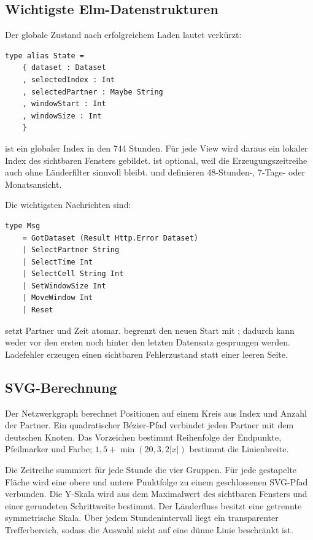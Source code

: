 \subsection*{Wichtigste Elm-Datenstrukturen}

Der globale Zustand nach erfolgreichem Laden lautet verkürzt:

\begin{lstlisting}[language={}]
type alias State =
    { dataset : Dataset
    , selectedIndex : Int
    , selectedPartner : Maybe String
    , windowStart : Int
    , windowSize : Int
    }
\end{lstlisting}

 ist ein globaler Index in den 744 Stunden. Für jede View
wird daraus ein lokaler Index des sichtbaren Fensters gebildet.
 ist optional, weil die Erzeugungszeitreihe auch ohne
Länderfilter sinnvoll bleibt.  und 
definieren 48-Stunden-, 7-Tage- oder Monatsansicht.

Die wichtigsten Nachrichten sind:

\begin{lstlisting}[language={}]
type Msg
    = GotDataset (Result Http.Error Dataset)
    | SelectPartner String
    | SelectTime Int
    | SelectCell String Int
    | SetWindowSize Int
    | MoveWindow Int
    | Reset
\end{lstlisting}

 setzt Partner und Zeit atomar.  begrenzt
den neuen Start mit ; dadurch kann weder vor den ersten noch hinter
den letzten Datensatz gesprungen werden. Ladefehler erzeugen einen sichtbaren
Fehlerzustand statt einer leeren Seite.

\subsection*{SVG-Berechnung}

Der Netzwerkgraph berechnet Positionen auf einem Kreis aus Index und Anzahl der
Partner. Ein quadratischer Bézier-Pfad verbindet jeden Partner mit dem
deutschen Knoten. Das Vorzeichen bestimmt Reihenfolge der Endpunkte,
Pfeilmarker und Farbe; \(1{,}5+\min(20,3{,}2|x|)\) bestimmt die Linienbreite.

Die Zeitreihe summiert für jede Stunde die vier Gruppen. Für jede gestapelte
Fläche wird eine obere und untere Punktfolge zu einem geschlossenen SVG-Pfad
verbunden. Die Y-Skala wird aus dem Maximalwert des sichtbaren Fensters und
einer gerundeten Schrittweite bestimmt. Der Länderfluss besitzt eine getrennte
symmetrische Skala. Über jedem Stundenintervall liegt ein transparenter
Trefferbereich, sodass die Auswahl nicht auf eine dünne Linie beschränkt ist.

